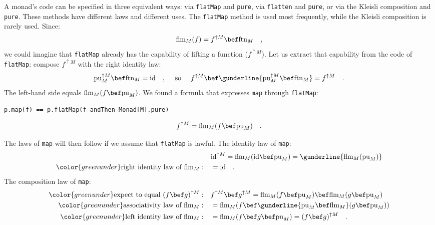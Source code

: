 A monad\textsf{'}s code can be specified in three equivalent ways: via \lstinline!flatMap!
and \lstinline!pure!, via \lstinline!flatten! and \lstinline!pure!,
or via the Kleisli composition and \lstinline!pure!. These methods
have different laws and different uses. The \lstinline!flatMap! method
is used most frequently, while the Kleisli composition is rarely used.
Since:
\[
\text{flm}_{M}(f)=f^{\uparrow M}\bef\text{ftn}_{M}\quad,
\]
we could imagine that \lstinline!flatMap! already has the capability
of lifting a function ($f^{\uparrow M}$). Let us extract that capability
from the code of \lstinline!flatMap!: compose $f^{\uparrow M}$ with
the right identity law:
\[
\text{pu}_{M}^{\uparrow M}\bef\text{ftn}_{M}=\text{id}\quad,\quad\text{ so }\quad f^{\uparrow M}\bef\gunderline{\text{pu}_{M}^{\uparrow M}\bef\text{ftn}_{M}}=f^{\uparrow M}\quad.
\]
The left-hand side equals $\text{flm}_{M}(f\bef\text{pu}_{M})$. We
found a formula that expresses \lstinline!map! through \lstinline!flatMap!:
\begin{lstlisting}
p.map(f) == p.flatMap(f andThen Monad[M].pure)
\end{lstlisting}
\begin{equation}
f^{\uparrow M}=\text{flm}_{M}(f\bef\text{pu}_{M})\quad.\label{eq:express-map-through-flatMap}
\end{equation}

The laws of \lstinline!map! will then follow if we assume that \lstinline!flatMap!
is lawful. The identity law of \lstinline!map!:
\begin{align*}
 & \text{id}^{\uparrow M}=\text{flm}_{M}(\text{id}\bef\text{pu}_{M})=\gunderline{\text{flm}_{M}(\text{pu}_{M})}\\
{\color{greenunder}\text{right identity law of }\text{flm}_{M}:}\quad & =\text{id}\quad.
\end{align*}
The composition law of \lstinline!map!:
\begin{align*}
{\color{greenunder}\text{expect to equal }(f\bef g)^{\uparrow M}:}\quad & f^{\uparrow M}\bef g^{\uparrow M}=\text{flm}_{M}(f\bef\text{pu}_{M})\bef\text{flm}_{M}(g\bef\text{pu}_{M})\\
{\color{greenunder}\text{associativity law of }\text{flm}_{M}:}\quad & =\text{flm}_{M}(f\bef\gunderline{\text{pu}_{M}\bef\text{flm}_{M}}(g\bef\text{pu}_{M}))\\
{\color{greenunder}\text{left identity law of }\text{flm}_{M}:}\quad & =\text{flm}_{M}(f\bef g\bef\text{pu}_{M})=(f\bef g)^{\uparrow M}\quad.
\end{align*}

